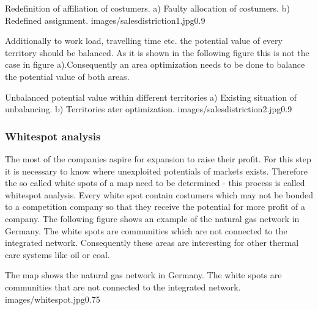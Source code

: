 \begin{figurevarSize}{Redefinition of affiliation of costumers. a) Faulty allocation of costumers. b) Redefined assignment. \cite{zimtec}}{images/salesdistriction1.jpg}{0.9}\end{figurevarSize} 

Additionally to work load, travelling time etc. the potential value of every territory should be balanced. As it is shown in the following figure this is not the case in figure a).Consequently an area optimization needs to be done to balance the potential value of both areas.

\begin{figurevarSize}{Unbalanced potential value within different territories a) Existing situation of unbalancing. b) Territories ater optimization. \cite{zimtec}}{images/salesdistriction2.jpg}{0.9}\end{figurevarSize} 

\subsubsection{Whitespot analysis}
The most of the companies aspire for expansion to raise their profit. For this step it is necessary to know where unexploited potentials of markets exists. Therefore the so called white spots of a map need to be determined - this process is called whitespot analysis. Every white spot contain costumers which may not be bonded to a competition company so that they receive the potential for more profit of a company. The following figure shows an example of the natural gas network in Germany. The white spots are communities which are not connected to the integrated network. Consequently these areas are interesting for other thermal care systems like oil or coal. 

\begin{figurevarSize}{The map shows the natural gas network in Germany. The white spots are communities that are not connected to the integrated network. \cite{tappert}}{images/whitespot.jpg}{0.75}\end{figurevarSize} 